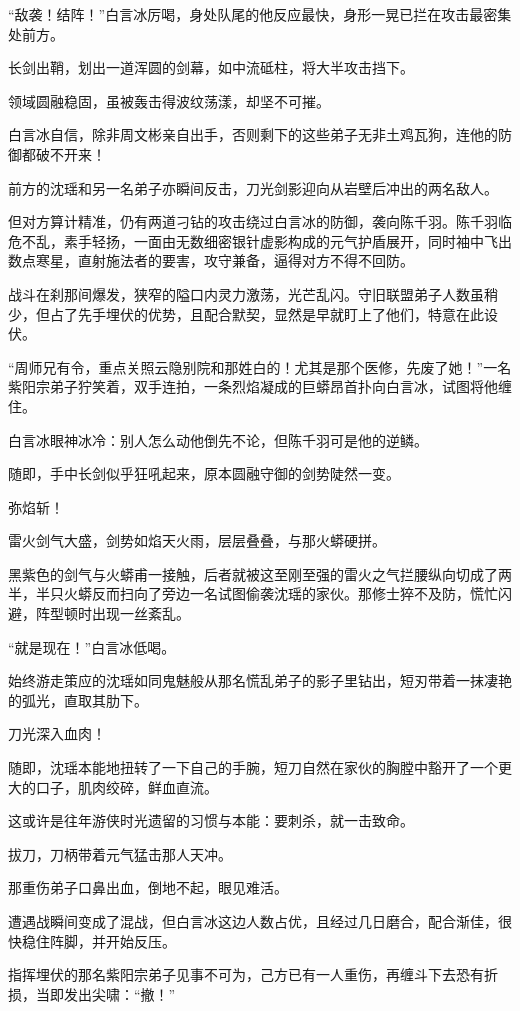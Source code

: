“敌袭！结阵！”白言冰厉喝，身处队尾的他反应最快，身形一晃已拦在攻击最密集处前方。

长剑出鞘，划出一道浑圆的剑幕，如中流砥柱，将大半攻击挡下。

领域圆融稳固，虽被轰击得波纹荡漾，却坚不可摧。

白言冰自信，除非周文彬亲自出手，否则剩下的这些弟子无非土鸡瓦狗，连他的防御都破不开来！

前方的沈瑶和另一名弟子亦瞬间反击，刀光剑影迎向从岩壁后冲出的两名敌人。

但对方算计精准，仍有两道刁钻的攻击绕过白言冰的防御，袭向陈千羽。陈千羽临危不乱，素手轻扬，一面由无数细密银针虚影构成的元气护盾展开，同时袖中飞出数点寒星，直射施法者的要害，攻守兼备，逼得对方不得不回防。

战斗在刹那间爆发，狭窄的隘口内灵力激荡，光芒乱闪。守旧联盟弟子人数虽稍少，但占了先手埋伏的优势，且配合默契，显然是早就盯上了他们，特意在此设伏。

“周师兄有令，重点关照云隐别院和那姓白的！尤其是那个医修，先废了她！”一名紫阳宗弟子狞笑着，双手连拍，一条烈焰凝成的巨蟒昂首扑向白言冰，试图将他缠住。

白言冰眼神冰冷：别人怎么动他倒先不论，但陈千羽可是他的逆鳞。

随即，手中长剑似乎狂吼起来，原本圆融守御的剑势陡然一变。

弥焰斩！

雷火剑气大盛，剑势如焰天火雨，层层叠叠，与那火蟒硬拼。

黑紫色的剑气与火蟒甫一接触，后者就被这至刚至强的雷火之气拦腰纵向切成了两半，半只火蟒反而扫向了旁边一名试图偷袭沈瑶的家伙。那修士猝不及防，慌忙闪避，阵型顿时出现一丝紊乱。

“就是现在！”白言冰低喝。

始终游走策应的沈瑶如同鬼魅般从那名慌乱弟子的影子里钻出，短刃带着一抹凄艳的弧光，直取其肋下。

刀光深入血肉！

随即，沈瑶本能地扭转了一下自己的手腕，短刀自然在家伙的胸膛中豁开了一个更大的口子，肌肉绞碎，鲜血直流。

这或许是往年游侠时光遗留的习惯与本能：要刺杀，就一击致命。

拔刀，刀柄带着元气猛击那人天冲。

那重伤弟子口鼻出血，倒地不起，眼见难活。

遭遇战瞬间变成了混战，但白言冰这边人数占优，且经过几日磨合，配合渐佳，很快稳住阵脚，并开始反压。

指挥埋伏的那名紫阳宗弟子见事不可为，己方已有一人重伤，再缠斗下去恐有折损，当即发出尖啸：“撤！”

